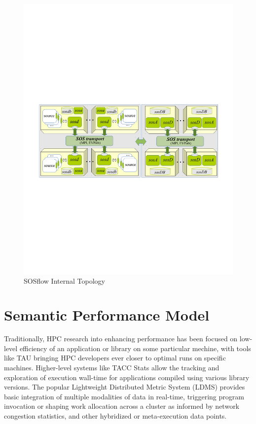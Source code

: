 \begin{figure}[!t]
  \centering
  \includegraphics[width=5in]{images/sos.pdf}
  \caption{SOSflow Internal Topology}
  \label{fig_sim}
\end{figure}





\section{Semantic Performance Model}

Traditionally, HPC research into enhancing performance has been
focused on low-level efficiency of an application or library on some
particular mechine, with tools like TAU bringing HPC developers ever
closer to optimal runs on specific machines.  Higher-level systems
like TACC Stats \cite{evans2014comprehensive} allow the tracking and
exploration of execution wall-time for applications compiled using
various library versions.  The popular Lightweight Distributed Metric
System (LDMS) \cite{agelastos2014lightweight} provides basic
integration of multiple modalities of data in real-time, triggering
program invocation or shaping work allocation across a cluster as
informed by network congestion statistics, and other hybridized or
meta-execution data points.

